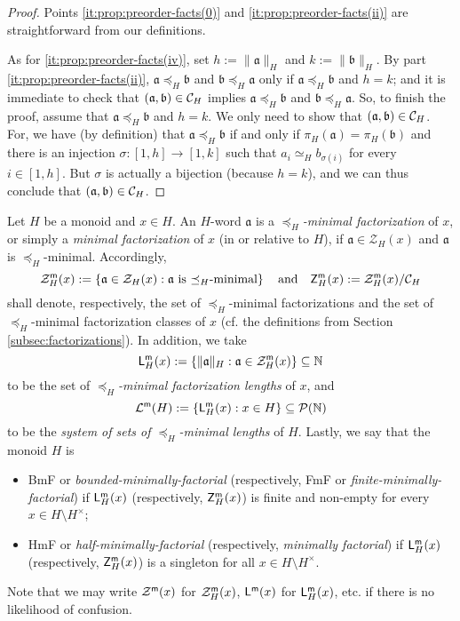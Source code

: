 %
\begin{proof}
Points \ref{it:prop:preorder-facts(0)} and \ref{it:prop:preorder-facts(ii)} are straightforward from our definitions.

As for \ref{it:prop:preorder-facts(iv)}, set $h := \|\mathfrak a\|_H$ and $k := \|\mathfrak b\|_H$. 
By part \ref{it:prop:preorder-facts(ii)}, $\mathfrak{a} \preceq_H \mathfrak{b}$ and $\mathfrak{b} \preceq_H \mathfrak{a}$ only if  $\mathfrak a \preceq_H \mathfrak b$ and $h = k$; and it is immediate to check that $(\mathfrak{a},\mathfrak{b}) \in \mathcal{C}_H$ implies $\mathfrak{a} \preceq_H \mathfrak{b}$ and $\mathfrak{b} \preceq_H \mathfrak{a}$. 
So, to finish the proof, assume that $\mathfrak a \preceq_H \mathfrak b$ and $h = k$. We only need to show that $(\mathfrak a, \mathfrak b) \in \mathcal{C}_H$. 
For, we have (by definition) that $\mathfrak a \preceq_H \mathfrak b$ if and only if $\pi_H(\mathfrak a) = \pi_H(\mathfrak b)$ and there is an injection $\sigma: [ 1, h ] \to [ 1, k ]$ 
such that $a_i \simeq_H b_{\sigma(i)}$ for every $i \in [ 1, h ]$. But $\sigma$ is actually a bijection (because $h = k$), and we can thus conclude that $(\mathfrak a, \mathfrak b) \in \mathcal{C}_H$.
\end{proof}
%
\begin{defn}\label{def:min-fac}
Let $H$ be a monoid and $x \in H$. An $H$-word $\mathfrak{a}$ is a \emph{$\preceq_H$-minimal factorization} of $x$, or simply a \emph{minimal factorization} of $x$ (in or relative to $H$), if $\mathfrak a \in \mathcal Z_H(x)$ and $\mathfrak a$ is $\preceq_H$-minimal. Accordingly, 
\[
\mathcal{Z}_{H}^{\mathsf{m}}(x) := \left\{ \mathfrak{a}\in \mathcal{Z}_H(x): \mathfrak{a} \textrm{ is $\preceq_H$-minimal} \right\}
\quad\text{and}\quad
\mathsf{Z}_{H}^{\mathsf{m}}(x):= \mathcal{Z}_{H}^{\mathsf{m}}(x)/\mathcal{C}_H
\]
shall denote, respectively, the set of $\preceq_H$-minimal factorizations and the set of $\preceq_H$-minimal factorization classes of $x$ (cf. the definitions from Section \ref{subsec:factorizations}). In addition, we take 
\[
\mathsf{L}_{H}^{\mathsf{m}}(x) := \left\{ \|\mathfrak{a}\|_H : \mathfrak{a} \in \mathcal{Z}_{H}^{\mathsf{m}}(x) \right\} \subseteq \mathbb{N}
\]
to be the set of \emph{$\preceq_H$-minimal factorization lengths} of $x$, and
\[
	\mathcal{L}^{\mathsf{m}}(H) := \left\{ \mathsf{L}_{H}^{\mathsf{m}}(x) : x\in H \right\} \subseteq \mathcal P(\mathbb{N})
\]
to be the \emph{system of sets of $\preceq_H$-minimal lengths} of $H$. Lastly, we say that the monoid $H$ is
\begin{itemize}
	\item \textup{BmF} or \emph{bounded-minimally-factorial} (respectively, \textup{FmF} or \emph{finite-minimally-factorial}) if $\mathsf{L}_{H}^{\mathsf{m}}(x)$ (respectively, $\mathsf{Z}_{H}^{\mathsf{m}}(x)$) is finite and non-empty for every $x\in H\setminus H^\times$;
	
	\item \textup{HmF} or \emph{half-minimally-factorial} (respectively, \emph{minimally factorial}) if $\mathsf{L}_{H}^{\mathsf{m}}(x)$ (respectively, $\mathsf{Z}_{H}^{\mathsf{m}}(x)$) is a singleton for all $x \in H \setminus H^\times$.
\end{itemize}
%
Note that we may write $\mathcal{Z}^{\mathsf{m}}(x)$ for $\mathcal{Z}_{H}^{\mathsf{m}}(x)$, $\mathsf {L}^{\mathsf{m}}(x)$ for $\mathsf {L}_{H}^{\mathsf{m}}(x)$, etc. if there is no likelihood of confusion.
\end{defn}
%

